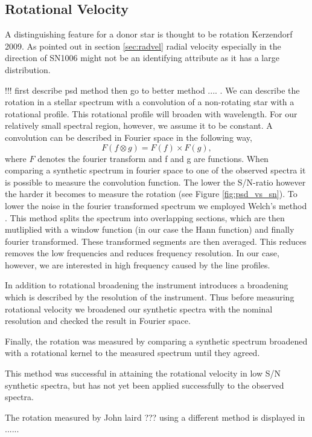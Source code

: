 \subsection{Rotational Velocity}
A distinguishing feature for a donor star is thought to be rotation Kerzendorf 2009. As pointed out in section \ref{sec:radvel} radial velocity especially in the direction of SN1006 might not be an identifying attribute as it has a large distribution. 

!!! first describe psd method then go to better method .... .
We can describe the rotation in a stellar spectrum with a convolution of a non-rotating star with a rotational profile. This rotational profile will broaden with wavelength. For our relatively small spectral region, however, we assume it to be constant. 
A convolution can be described in Fourier space in the following way,
\[
	F(f \otimes g) = F(f) \times F(g), 
\]
where $F$ denotes the fourier transform and f and g are functions. When comparing a synthetic spectrum in fourier space to one of the observed spectra it is possible to measure the convolution function. The lower the S/N-ratio however the harder it becomes to measure the rotation (see Figure \ref{fig:psd_vs_sn}). To lower the noise in the fourier transformed spectrum we employed Welch's method \cite{1967ITAE...15...70W}. This method splits the spectrum into overlapping sections, which are then mutliplied with a window function (in our case the Hann function) and finally fourier transformed. These transformed segments are then averaged. This reduces removes the low frequencies and reduces frequency resolution. In our case, however, we are interested in high frequency caused by the line profiles. 

In addition to rotational broadening the instrument introduces a broadening which is described by the resolution of the instrument. Thus before measuring rotational velocity we broadened our synthetic spectra with the nominal resolution and checked the result in Fourier space. 

Finally, the rotation was measured by comparing a synthetic spectrum broadened with a rotational kernel to the measured spectrum until they agreed. 

This method was successful in attaining the rotational velocity in low S/N synthetic spectra, but has not yet been applied successfully to the observed spectra.

The rotation measured by John laird ??? using a different method is displayed in ......


